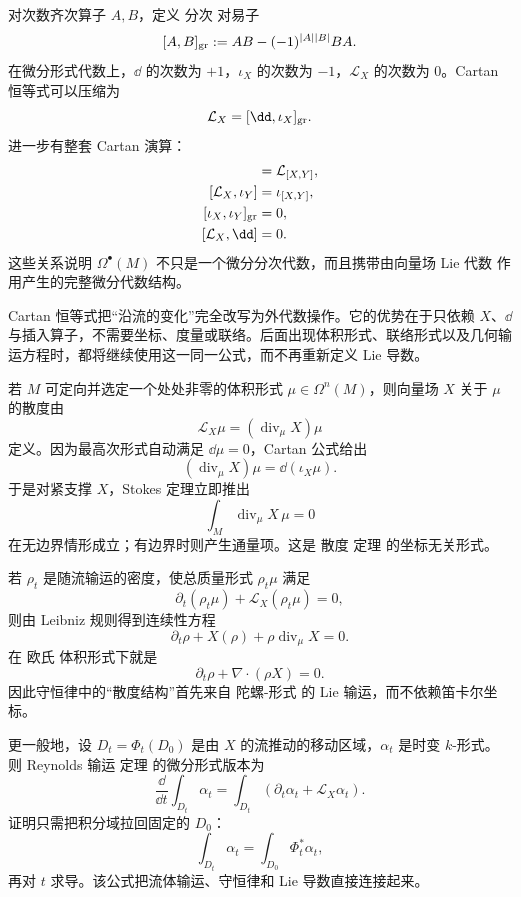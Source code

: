 对次数齐次算子 $A,B$，定义 分次 对易子
\[
[A,B]_{\rm gr}
:=AB-(-1)^{|A||B|}BA.
\]
在微分形式代数上，$\dd$ 的次数为 $+1$，$\iota_X$ 的次数为 $-1$，$\mathcal L_X$ 的次数为 $0$。Cartan 恒等式可以压缩为
\[
\mathcal L_X=[\dd,\iota_X]_{\rm gr}.
\]
进一步有整套 Cartan 演算：
\begin{align}
[\mathcal L_X,\mathcal L_Y]&=\mathcal L_{[X,Y]},
\label{eq:cartan-lie-lie}\\
[\mathcal L_X,\iota_Y]&=\iota_{[X,Y]},
\label{eq:cartan-lie-iota}\\
[\iota_X,\iota_Y]_{\rm gr}&=0,
\label{eq:cartan-iota-iota}\\
[\mathcal L_X,\dd]&=0.
\label{eq:cartan-lie-d}
\end{align}
这些关系说明 $\Omega^\bullet(M)$ 不只是一个微分分次代数，而且携带由向量场 Lie 代数 作用产生的完整微分代数结构。

Cartan 恒等式把“沿流的变化”完全改写为外代数操作。它的优势在于只依赖 $X$、$\dd$ 与插入算子，不需要坐标、度量或联络。后面出现体积形式、联络形式以及几何输运方程时，都将继续使用这一同一公式，而不再重新定义 Lie 导数。

若 $M$ 可定向并选定一个处处非零的体积形式 $\mu\in\Omega^n(M)$，则向量场 $X$ 关于 $\mu$ 的散度由
\begin{equation*}\mathcal L_X\mu=(\operatorname{div}_\mu X)\mu\end{equation*}
定义。因为最高次形式自动满足 $\dd\mu=0$，Cartan 公式给出
\begin{equation*}(\operatorname{div}_\mu X)\mu
=\dd(\iota_X\mu).\end{equation*}
于是对紧支撑 $X$，Stokes 定理立即推出
\[
\int_M\operatorname{div}_\mu X\,\mu=0
\]
在无边界情形成立；有边界时则产生通量项。这是 散度 定理 的坐标无关形式。

若 $\rho_t$ 是随流输运的密度，使总质量形式 $\rho_t\mu$ 满足
\[
\partial_t(\rho_t\mu)+\mathcal L_X(\rho_t\mu)=0,
\]
则由 Leibniz 规则得到连续性方程
\begin{equation*}\partial_t\rho+X(\rho)+\rho\operatorname{div}_\mu X=0.\end{equation*}
在 欧氏 体积形式下就是
\[
\partial_t\rho+\nabla\cdot(\rho X)=0.
\]
因此守恒律中的“散度结构”首先来自 陀螺-形式 的 Lie 输运，而不依赖笛卡尔坐标。

更一般地，设 $D_t=\Phi_t(D_0)$ 是由 $X$ 的流推动的移动区域，$\alpha_t$ 是时变 $k$-形式。则 Reynolds 输运 定理 的微分形式版本为
\begin{equation*}\frac{\dd}{\dd t}\int_{D_t}\alpha_t
=\int_{D_t}(\partial_t\alpha_t+\mathcal L_X\alpha_t).\end{equation*}
证明只需把积分域拉回固定的 $D_0$：
\[
\int_{D_t}\alpha_t
=\int_{D_0}\Phi_t^*\alpha_t,
\]
再对 $t$ 求导。该公式把流体输运、守恒律和 Lie 导数直接连接起来。

